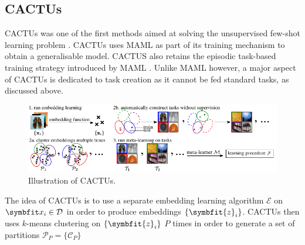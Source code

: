 \subsection{CACTUs}\label{ssec:ufsl-cactus}
CACTUs was one of the first methods aimed at solving the unsupervised few-shot learning problem \parencite{Hsu2018UnsupervisedMeta-Learning}. CACTUs uses MAML as part of its training mechanism to obtain a generalisable model. CACTUS also retains the episodic task-based training strategy introduced by MAML \parencite{Finn2017Model-agnosticNetworks}. Unlike MAML however, a major aspect of CACTUs is dedicated to task creation as it cannot be fed standard tasks, as discussed above.
\begin{figure}[ht]
    \centering
    \includegraphics[width=\linewidth]{chapters/assets/fsl/cactus.pdf}
    \caption{Illustration of CACTUs. }
    \label{fig:cactus}
\end{figure}
The idea of CACTUs is to use a separate embedding learning algorithm $\mathcal{E}$ on $\bfitx_i \in \mathcal{D}$ in order to produce embeddings $\{\symbfit{z}_i\}$. CACTUs then uses $k$-means clustering on $\{\symbfit{z}_i\}$ $P$ times in order to generate a set of partitions $\mathcal{P}_P = \{\mathcal{C}_P\}$ 


